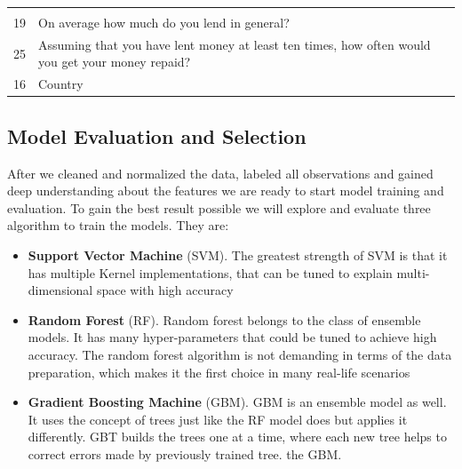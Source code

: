 \begin{longtable}[]{@{}ll@{}}
\begin{minipage}[t]{0.89\columnwidth}
\end{minipage}\tabularnewline
\begin{minipage}[t]{0.05\columnwidth}\raggedright
19\strut
\end{minipage} & \begin{minipage}[t]{0.89\columnwidth}\raggedright
On average how much do you lend in general?\strut
\end{minipage}\tabularnewline
\begin{minipage}[t]{0.05\columnwidth}\raggedright
25\strut
\end{minipage} & \begin{minipage}[t]{0.89\columnwidth}\raggedright
Assuming that you have lent money at least ten times, how often would
you get your money repaid?\strut
\end{minipage}\tabularnewline
\begin{minipage}[t]{0.05\columnwidth}\raggedright
16\strut
\end{minipage} & \begin{minipage}[t]{0.89\columnwidth}\raggedright
Country\strut
\end{minipage}\tabularnewline
\bottomrule
\end{longtable}

\hypertarget{model-evaluation-and-selection}{%
\subsection{Model Evaluation and
Selection}\label{model-evaluation-and-selection}}

After we cleaned and normalized the data, labeled all observations and
gained deep understanding about the features we are ready to start model
training and evaluation. To gain the best result possible we will
explore and evaluate three algorithm to train the models. They are:

\begin{itemize}
\tightlist
\item
  \textbf{Support Vector Machine} (SVM). The greatest strength of SVM is
  that it has multiple Kernel implementations, that can be tuned to
  explain multi-dimensional space with high accuracy
\item
  \textbf{Random Forest} (RF). Random forest belongs to the class of
  ensemble models. It has many hyper-parameters that could be tuned to
  achieve high accuracy. The random forest algorithm is not demanding in
  terms of the data preparation, which makes it the first choice in many
  real-life scenarios
\item
  \textbf{Gradient Boosting Machine} (GBM). GBM is an ensemble model as
  well. It uses the concept of trees just like the RF model does but
  applies it differently. GBT builds the trees one at a time, where each
  new tree helps to correct errors made by previously trained tree. the
  GBM.
\end{itemize}


